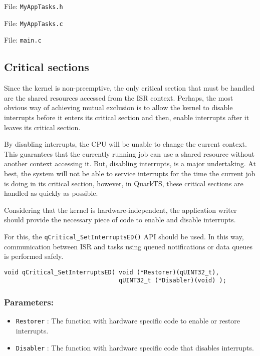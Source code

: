 File: \lstinline{MyAppTasks.h}


File: \lstinline{MyAppTasks.c}


File: \lstinline{main.c}



\subsection{Critical sections}
Since the kernel is non-preemptive, the only critical section that must be handled are the shared resources accessed from the ISR context. Perhaps, the most obvious way of achieving mutual exclusion is to allow the kernel to disable interrupts before it enters its critical section and then, enable interrupts after it leaves its critical section. 
\medskip

By disabling interrupts, the CPU will be unable to change the current context. This guarantees that the currently running job can use a shared resource without another context accessing it. But, disabling interrupts, is a major undertaking. At best, the system will not be able to service interrupts for the time the current job is doing in its critical section, however, in QuarkTS, these critical sections are handled as quickly as possible.  

Considering that the kernel is hardware-independent, the application writer should provide the necessary piece of code to enable and disable interrupts.

For this, the \lstinline{qCritical_SetInterruptsED()}  API should be used. In this way, communication between ISR and tasks using queued notifications or data queues is performed safely. 
\medskip

\begin{lstlisting}[style=CStyle]
void qCritical_SetInterruptsED( void (*Restorer)(qUINT32_t), 
                                qUINT32_t (*Disabler)(void) );
\end{lstlisting}

\subsubsection*{Parameters:}
\begin{itemize}
    \item \lstinline{Restorer} : The function with hardware specific code to enable or restore interrupts.
    \item \lstinline{Disabler} : The function with hardware specific code that disables interrupts.
\end{itemize}

